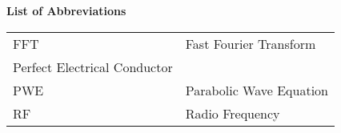 \noindent\Large{\bf{List of Abbreviations}}

\vspace{24pt}

\small\normalsize

\begin{supertabular}{ll}
FFT & Fast Fourier Transform\\
Perfect Electrical Conductor\\
PWE & Parabolic Wave Equation\\
RF & Radio Frequency\\
\end{supertabular}
